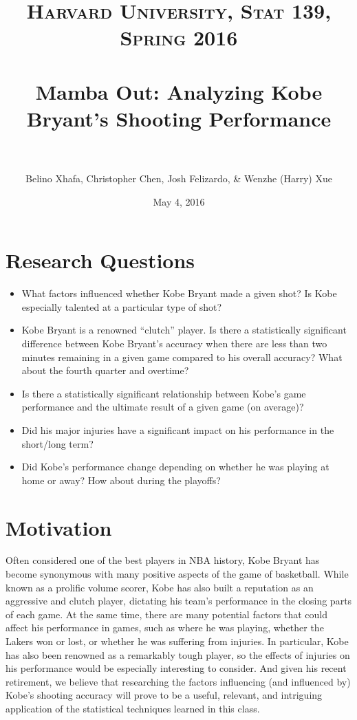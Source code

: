\documentclass[paper=a4, fontsize=11pt]{scrartcl} %
\title{ 
\normalfont \normalsize 
\textsc{Harvard University, Stat 139, Spring 2016} \\ [25pt] %
\horrule{0.5pt} \\[0.4cm] %
\huge Mamba Out: Analyzing Kobe Bryant's Shooting Performance \\ %
\horrule{2pt} \\[0.5cm] %
}
\author{Belino Xhafa, Christopher Chen, Josh Felizardo, \& Wenzhe (Harry) Xue}
\date{\normalsize May 4, 2016} %
\numberwithin{equation}{section} %
\numberwithin{figure}{section} %
\numberwithin{table}{section} %
\begin{document}
\maketitle %

\tableofcontents
\section{Research Questions}
\begin{itemize}
	\item What factors influenced whether Kobe Bryant made a given shot? Is Kobe especially talented at a particular type of shot?
	\item Kobe Bryant is a renowned ``clutch'' player. Is there a statistically significant difference between Kobe Bryant's accuracy when there are less than two minutes remaining in a given game compared to his overall accuracy? What about the fourth quarter and overtime?
	\item Is there a statistically significant relationship between Kobe's game performance and the ultimate result of a given game (on average)?
	\item Did his major injuries have a significant impact on his performance in the short/long term?
	\item Did Kobe's performance change depending on whether he was playing at home or away? How about during the playoffs?
\end{itemize}
\section{Motivation}
\hspace*{1cm}Often considered one of the best players in NBA history, Kobe Bryant has become synonymous with many positive aspects of the game of basketball. While known as a prolific volume scorer, Kobe has also built a reputation as an aggressive and clutch player, dictating his team's performance in the closing parts of each game. At the same time, there are many potential factors that could affect his performance in games, such as where he was playing, whether the Lakers won or lost, or whether he was suffering from injuries. In particular, Kobe has also been renowned as a remarkably tough player, so the effects of injuries on his performance would be especially interesting to consider. And given his recent retirement, we believe that researching the factors influencing (and influenced by) Kobe's shooting accuracy will prove to be a useful, relevant, and intriguing application of the statistical techniques learned in this class. 
\end{document}
